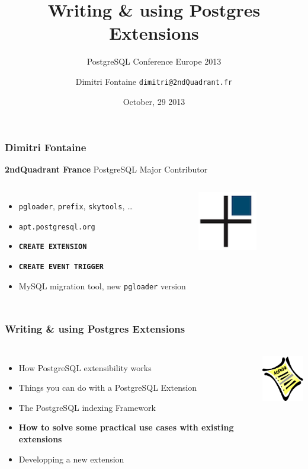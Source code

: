 \documentclass{beamer}
\title{Writing \& using Postgres Extensions}
\subtitle{PostgreSQL Conference Europe 2013}
\author{Dimitri Fontaine \texttt{dimitri@2ndQuadrant.fr}}
\date{October, 29 2013}
\begin{document}
\frame{\titlepage}

\begin{frame}[fragile]
  \frametitle{Dimitri Fontaine}

  \begin{center}
    \textbf{2ndQuadrant France}
    \linebreak
    PostgreSQL Major Contributor
  \end{center}
  \vfill

\begin{columns}[c]

  \begin{itemize}
   \item \texttt{pgloader}, \texttt{prefix}, \texttt{skytools}, …
   \item \texttt{apt.postgresql.org}
   \item \texttt{\textbf{CREATE EXTENSION}}
   \item \texttt{\textbf{CREATE EVENT TRIGGER}}
   \item MySQL migration tool, new \texttt{pgloader} version
  \end{itemize}  

\begin{center}
  \includegraphics[height=7em]{2ndQuadrant-cross.png}
\end{center}
\end{columns}
\end{frame}

\begin{frame}[fragile]
  \frametitle{Writing \& using Postgres Extensions}

  \vfill

\begin{columns}

  \begin{itemize}
  \item How PostgreSQL extensibility works
  \item Things you can do with a PostgreSQL Extension
  \item The PostgreSQL indexing Framework
  \item \textbf{How to solve some practical use cases with existing extensions}
  \item Developping a new extension
  \end{itemize}

\begin{center}
  \includegraphics[height=6em]{agenda.jpg}
\end{center}
\end{columns}
\end{frame}
\end{document}
